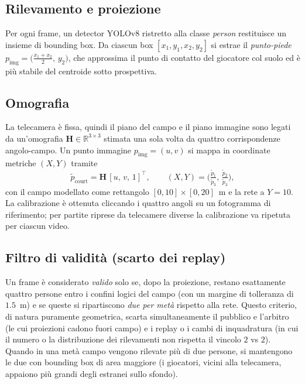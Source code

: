 \documentclass[10pt,twocolumn,a4paper]{article}
\begin{document}
	\subsection{Rilevamento e proiezione}

	Per ogni frame, un detector YOLOv8 ristretto alla
	classe \emph{person} restituisce un insieme di bounding box. Da ciascun box
	$[x_1,y_1,x_2,y_2]$ si estrae il \emph{punto-piede}
	$p_{\text{img}}=\big(\tfrac{x_1+x_2}{2},\,y_2\big)$, che approssima il punto
	di contatto del giocatore col suolo ed è più stabile del centroide sotto
	prospettiva.

	\subsection{Omografia}

	La telecamera è fissa, quindi il piano del campo e il piano immagine sono
	legati da un'omografia $\mathbf{H}\in\mathbb{R}^{3\times3}$ stimata una sola
	volta da quattro corrispondenze angolo-campo. Un punto immagine
	$p_{\text{img}}=(u,v)$ si mappa in coordinate metriche $(X,Y)$ tramite
	\begin{equation}
		\tilde{p}_{\text{court}} = \mathbf{H}\,[u,\,v,\,1]^\top,\qquad
		(X,Y)=\Big(\tfrac{\tilde{p}_1}{\tilde{p}_3},\,\tfrac{\tilde{p}_2}{\tilde{p}_3}\Big),
	\end{equation}
	con il campo modellato come rettangolo $[0,10]\times[0,20]$~m e la rete a
	$Y=10$. La calibrazione è ottenuta cliccando i quattro angoli su un
	fotogramma di riferimento; per partite riprese da telecamere diverse la
	calibrazione va ripetuta per ciascun video.

	\subsection{Filtro di validità (scarto dei replay)}

	Un frame è considerato \emph{valido} solo se, dopo la proiezione, restano
	esattamente quattro persone entro i confini logici del campo (con un margine
	di tolleranza di $1.5$~m) e se queste si ripartiscono \emph{due per metà}
	rispetto alla rete. Questo criterio, di natura puramente geometrica, scarta
	simultaneamente il pubblico e l'arbitro (le cui proiezioni cadono fuori
	campo) e i replay o i cambi di inquadratura (in cui il numero o la
	distribuzione dei rilevamenti non rispetta il vincolo $2$ vs $2$). Quando in
	una metà campo vengono rilevate più di due persone, si mantengono le due con
	bounding box di area maggiore (i giocatori, vicini alla telecamera, appaiono
	più grandi degli estranei sullo sfondo).
\end{document}
